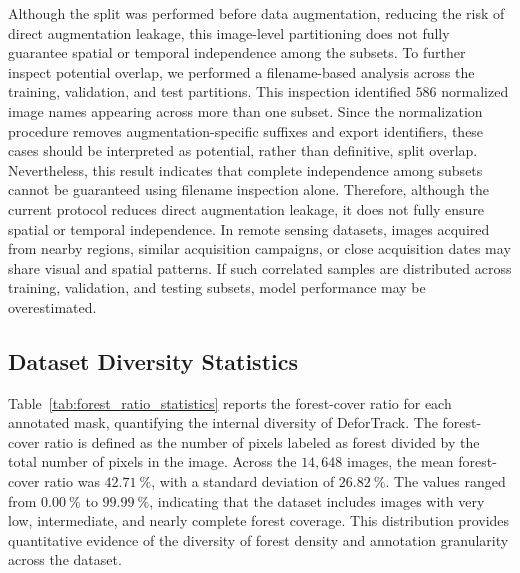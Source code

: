 \documentclass[journal,article,submit,pdftex,moreauthors]{Definitions/mdpi}
\begin{document}
Although the split was performed before data augmentation, reducing the risk of direct augmentation leakage, this image-level partitioning does not fully guarantee spatial or temporal independence among the subsets. To further inspect potential overlap, we performed a filename-based analysis across the training, validation, and test partitions. This inspection identified $586$ normalized image names appearing across more than one subset. Since the normalization procedure removes augmentation-specific suffixes and export identifiers, these cases should be interpreted as potential, rather than definitive, split overlap. Nevertheless, this result indicates that complete independence among subsets cannot be guaranteed using filename inspection alone.
Therefore, although the current protocol reduces direct augmentation leakage, it does not fully ensure spatial or temporal independence. In remote sensing datasets, images acquired from nearby regions, similar acquisition campaigns, or close acquisition dates may share visual and spatial patterns. If such correlated samples are distributed across training, validation, and testing subsets, model performance may be overestimated.

\subsection{Dataset Diversity Statistics}

Table~\ref{tab:forest_ratio_statistics} reports the forest-cover ratio for each annotated mask, quantifying the internal diversity of DeforTrack. The forest-cover ratio is defined as the number of pixels labeled as forest divided by the total number of pixels in the image. Across the $14,648$ images, the mean forest-cover ratio was $42.71~\%$, with a standard deviation of $26.82~\%$. The values ranged from $0.00~\%$ to $99.99~\%$, indicating that the dataset includes images with very low, intermediate, and nearly complete forest coverage. This distribution provides quantitative evidence of the diversity of forest density and annotation granularity across the dataset.
\end{document}
